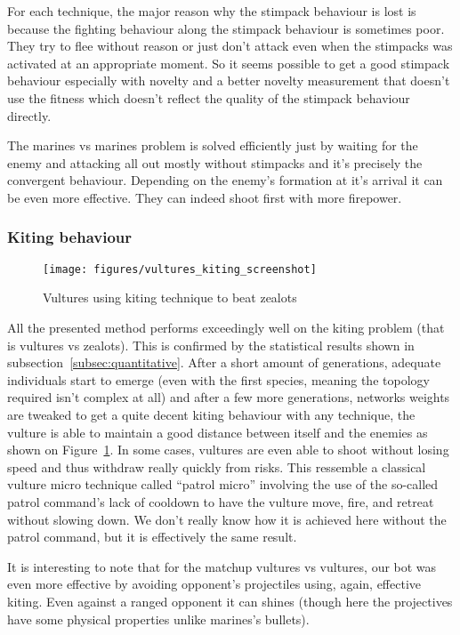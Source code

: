 For each technique, the major reason why the stimpack behaviour is lost is because the fighting behaviour along
the stimpack behaviour is sometimes poor. They try to flee without reason or just don't attack even when the
stimpacks was activated at an appropriate moment.
So it seems possible to get a good stimpack behaviour especially with novelty and a better novelty measurement
that doesn't use the fitness which doesn't reflect the quality of the stimpack behaviour directly.

The marines vs marines problem is solved efficiently just by waiting for the
enemy and attacking all out mostly without stimpacks and it's precisely the convergent behaviour.
Depending on the enemy’s formation at it’s arrival it can be even more effective.
They can indeed shoot first with more firepower.

\subsubsection{Kiting behaviour}

\begin{figure}
    \texttt{[image: figures/vultures\_kiting\_screenshot]}
    \caption{Vultures using kiting technique to beat zealots}\label{fig:vultures_kiting}
\end{figure}

All the presented method performs exceedingly well on the kiting problem (that is vultures vs zealots).
This is confirmed by the statistical results shown in subsection~\ref{subsec:quantitative}. After a short amount of generations, adequate
individuals start to emerge (even with the first species, meaning the topology required isn’t complex at all)
and after a few more generations, networks weights are tweaked to get a quite decent kiting behaviour with any
technique, the vulture is able to maintain a good distance between itself and the enemies as shown on
Figure~\ref{fig:vultures_kiting}. In some cases, vultures are even able to shoot without
losing speed and thus withdraw really quickly from risks. This ressemble
a classical vulture micro technique called “patrol micro” involving the use of the so-called patrol command's
lack of cooldown to have the vulture move, fire, and retreat without slowing down. We don’t really know how it
is achieved here without the patrol command, but it is effectively the same result.

It is interesting to note that for the matchup vultures vs vultures, our bot was even more effective by avoiding opponent's
projectiles using, again, effective kiting. Even against a ranged opponent it can shines (though here the projectives have
some physical properties unlike marines's bullets).

